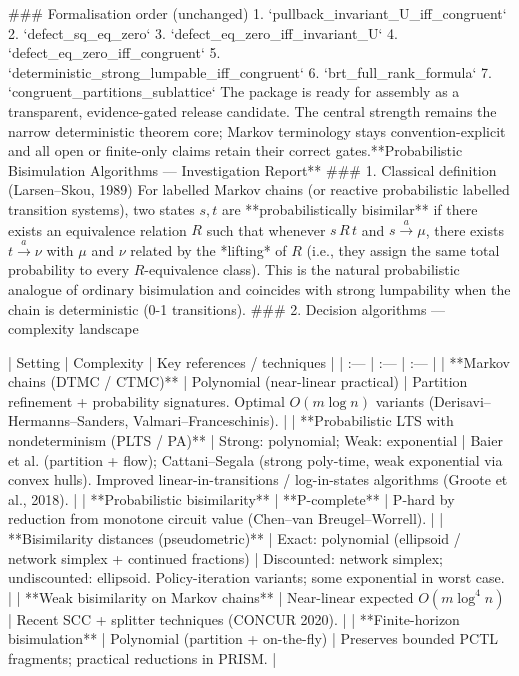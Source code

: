 ### Formalisation order (unchanged)
1. `pullback_invariant_U_iff_congruent`  
2. `defect_sq_eq_zero`  
3. `defect_eq_zero_iff_invariant_U`  
4. `defect_eq_zero_iff_congruent`  
5. `deterministic_strong_lumpable_iff_congruent`  
6. `brt_full_rank_formula`  
7. `congruent_partitions_sublattice`
The package is ready for assembly as a transparent, evidence-gated release candidate. The central strength remains the narrow deterministic theorem core; Markov terminology stays convention-explicit and all open or finite-only claims retain their correct gates.**Probabilistic Bisimulation Algorithms — Investigation Report**
### 1. Classical definition (Larsen–Skou, 1989)
For labelled Markov chains (or reactive probabilistic labelled transition systems), two states \(s,t\) are **probabilistically bisimilar** if there exists an equivalence relation \(R\) such that whenever \(s\,R\,t\) and \(s\xrightarrow{a}\mu\), there exists \(t\xrightarrow{a}\nu\) with \(\mu\) and \(\nu\) related by the *lifting* of \(R\) (i.e., they assign the same total probability to every \(R\)-equivalence class).
This is the natural probabilistic analogue of ordinary bisimulation and coincides with strong lumpability when the chain is deterministic (0-1 transitions).
### 2. Decision algorithms — complexity landscape

| Setting | Complexity | Key references / techniques |
| :--- | :--- | :--- |
| **Markov chains (DTMC / CTMC)** | Polynomial (near-linear practical) | Partition refinement + probability signatures. Optimal \(O(m\log n)\) variants (Derisavi–Hermanns–Sanders, Valmari–Franceschinis). |
| **Probabilistic LTS with nondeterminism (PLTS / PA)** | Strong: polynomial; Weak: exponential | Baier et al. (partition + flow); Cattani–Segala (strong poly-time, weak exponential via convex hulls). Improved linear-in-transitions / log-in-states algorithms (Groote et al., 2018). |
| **Probabilistic bisimilarity** | **P-complete** | P-hard by reduction from monotone circuit value (Chen–van Breugel–Worrell). |
| **Bisimilarity distances (pseudometric)** | Exact: polynomial (ellipsoid / network simplex + continued fractions) | Discounted: network simplex; undiscounted: ellipsoid. Policy-iteration variants; some exponential in worst case. |
| **Weak bisimilarity on Markov chains** | Near-linear expected \(O(m\log^4 n)\) | Recent SCC + splitter techniques (CONCUR 2020). |
| **Finite-horizon bisimulation** | Polynomial (partition + on-the-fly) | Preserves bounded PCTL fragments; practical reductions in PRISM. |

